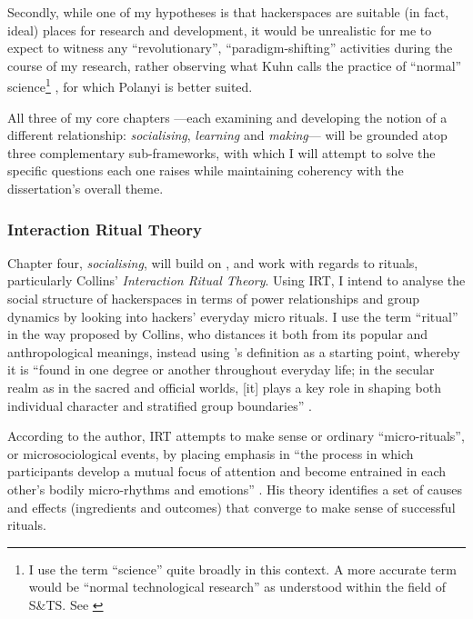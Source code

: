 Secondly, while one of my hypotheses is that hackerspaces are suitable (in fact, ideal) places for research and development, it would be unrealistic for me to expect to witness any ``revolutionary'', ``paradigm-shifting'' activities during the course of my research, rather observing what Kuhn calls the practice of ``normal'' science\footnote{I use the term ``science'' quite broadly in this context. A more accurate term would be ``normal technological research'' as understood within the field of S\&TS. See \citet[p.75--85]{sismondo04}} \citep[p.10]{kuhn62}, for which Polanyi is better suited.

All three of my core chapters ---each examining and developing the notion of a different relationship: \textit{socialising}, \textit{learning} and  \textit{making}--- will be grounded atop three complementary sub-frameworks, with which I will attempt to solve the specific questions each one raises while maintaining coherency with the dissertation's overall theme.

\subsubsection{Interaction Ritual Theory}

Chapter four, \textit{socialising}, will build on ,  and  work with regards to rituals, particularly Collins' \textit{Interaction Ritual Theory}. Using IRT, I intend to analyse the social structure of hackerspaces in terms of power relationships and group dynamics by looking into hackers' everyday micro rituals. I use the term ``ritual'' in the way proposed by Collins, who distances it both from its popular and anthropological meanings, instead using \citeauthor{goffman67}'s definition as a starting point, whereby it is ``found in one degree or another throughout everyday life; in the secular realm as in the sacred and official worlds, [it] plays a key role in shaping both individual character and stratified group boundaries'' \citep[p.8]{collins04}.

According to the author, IRT attempts to make sense or ordinary ``micro-rituals'', or microsociological events, by placing emphasis in ``the process in which participants develop a mutual focus of attention and become entrained in each other's bodily micro-rhythms and emotions'' \citep[p.47]{collins04}. His theory identifies a set of causes and effects (ingredients and outcomes) that converge to make sense of successful rituals. 

